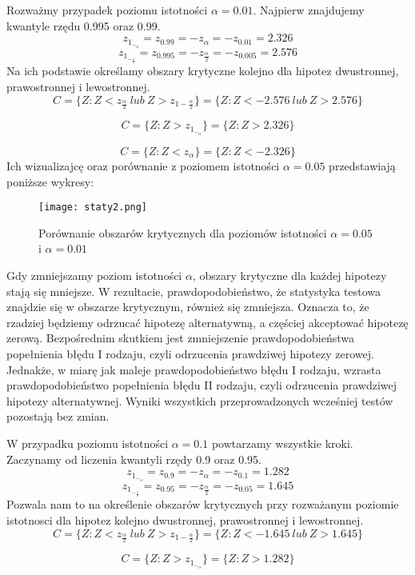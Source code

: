 \documentclass[12pt,letterpaper]{article}
\theoremstyle{definition}
\begin{document}
Rozważmy przypadek poziomu istotności \(\alpha = 0.01\). Najpierw znajdujemy kwantyle rzędu 0.995 oraz 0.99.
\[
z_1_-_{\alpha} = z_{0.99}  = - z_{\alpha} = - z_{0.01} = 2.326
\]
\[
z_1_-_\frac{\alpha}{2} = z_{0.995} = - z_\frac{\alpha}{2} = -z_{0.005} = 2.576
\]
Na ich podstawie określamy obszary krytyczne kolejno dla hipotez dwustronnej, prawostronnej i lewostronnej. 
\[
C=\{Z:Z < z_\frac{\alpha}{2} \ lub \  Z > z_{1-\frac{\alpha}{2}}\} = \{Z:Z < -2.576 \ lub \  Z > 2.576\}
\]

\[
C = \{Z : Z > z_1_-_{\alpha}\} = \{Z : Z > 2.326\} 
\]

\[
C = \{Z : Z < z_{\alpha} \} = \{Z : Z < -2.326\}
\]
Ich wizualizajcę oraz porównanie z poziomem istotności $\alpha = 0.05$ przedstawiają poniższe wykresy:

\begin{figure}[H]
			\centering

				\centering
				\texttt{[image: staty2.png]}
				\caption{Porównanie obszarów krytycznych dla poziomów istotności $\alpha = 0.05$ i $\alpha = 0.01$}
				\label{fig:zdjecie1}
			\hfill
		\end{figure}
Gdy zmniejszamy poziom istotności $\alpha$, obszary krytyczne dla każdej hipotezy stają się mniejsze. W rezultacie, prawdopodobieństwo, że statystyka testowa znajdzie się w obszarze krytycznym, również się zmniejsza. Oznacza to, że rzadziej będziemy odrzucać hipotezę alternatywną, a częściej akceptować hipotezę zerową. Bezpośrednim skutkiem jest zmniejszenie prawdopodobieństwa popełnienia błędu I rodzaju, czyli odrzucenia prawdziwej hipotezy zerowej. Jednakże, w miarę jak maleje prawdopodobieństwo błędu I rodzaju, wzrasta prawdopodobieństwo popełnienia błędu II rodzaju, czyli odrzucenia prawdziwej hipotezy alternatywnej. Wyniki wszystkich przeprowadzonych wcześniej testów pozostają bez zmian.

W przypadku poziomu istotności $\alpha = 0.1$ powtarzamy wszystkie kroki. Zaczynamy od liczenia kwantyli rzędy 0.9 oraz 0.95.
\[
z_1_-_{\alpha} = z_{0.9}  = - z_{\alpha} = - z_{0.1} = 1.282
\]
\[
z_1_-_\frac{\alpha}{2} = z_{0.95} = - z_\frac{\alpha}{2} = -z_{0.05} = 1.645
\]
Pozwala nam to na określenie obszarów krytycznych przy rozważanym poziomie istotnosci dla hipotez kolejno dwustronnej, prawostronnej i lewostronnej.
\[
C=\{Z:Z < z_\frac{\alpha}{2} \ lub \  Z > z_{1-\frac{\alpha}{2}}\} = \{Z:Z < -1.645 \ lub \  Z > 1.645\}
\]

\[
C = \{Z : Z > z_1_-_{\alpha}\} = \{Z : Z > 1.282\} 
\]
\end{document}
